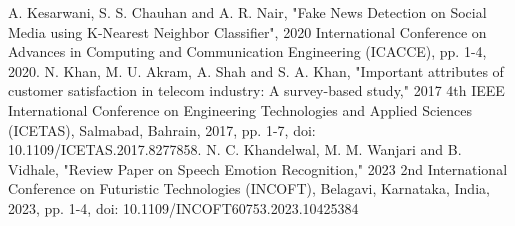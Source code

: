 \documentclass[conference]{IEEEtran}
\begin{document}
\begin{thebibliography}{00}
 A. Kesarwani, S. S. Chauhan and A. R. Nair, "Fake News Detection on Social Media using K-Nearest Neighbor Classifier", 2020 International Conference on Advances in Computing and Communication Engineering (ICACCE), pp. 1-4, 2020.
 N. Khan, M. U. Akram, A. Shah and S. A. Khan, "Important attributes of customer satisfaction in telecom industry: A survey-based study," 2017 4th IEEE International Conference on Engineering Technologies and Applied Sciences (ICETAS), Salmabad, Bahrain, 2017, pp. 1-7, doi: 10.1109/ICETAS.2017.8277858. 
 N. C. Khandelwal, M. M. Wanjari and B. Vidhale, "Review Paper on Speech Emotion Recognition," 2023 2nd International Conference on Futuristic Technologies (INCOFT), Belagavi, Karnataka, India, 2023, pp. 1-4, doi: 10.1109/INCOFT60753.2023.10425384

\end{thebibliography}
\vspace{12pt}
\end{document}

